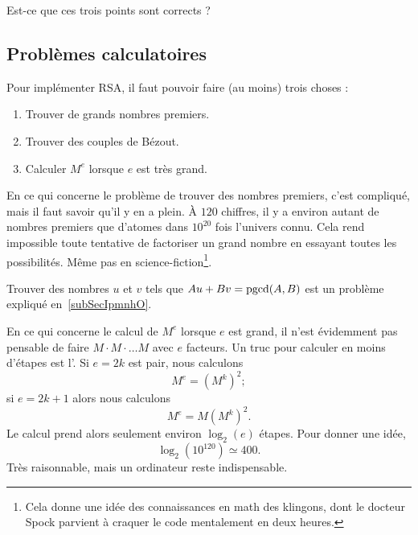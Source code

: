 \begin{probleme}\label{ProbGAYFooZATuYy}
    Est-ce que ces trois points sont corrects ?
\end{probleme}

\subsection{Problèmes calculatoires}

Pour implémenter RSA, il faut pouvoir faire (au moins) trois choses :
\begin{enumerate}
    \item
        Trouver de grands nombres premiers.
    \item
        Trouver des couples de Bézout.
    \item
        Calculer \( M^e\) lorsque \( e\) est très grand.
\end{enumerate}
En ce qui concerne le problème de trouver des nombres premiers, c'est compliqué, mais il faut savoir qu'il y en a plein. À \( 120\) chiffres, il y a environ autant de nombres premiers que d'atomes dans \( 10^{20}\) fois l'univers connu. Cela rend impossible toute tentative de factoriser un grand nombre en essayant toutes les possibilités. Même pas en science-fiction\footnote{Cela donne une idée des connaissances en math des klingons, dont le docteur Spock parvient à craquer le code mentalement en deux heures.}.

Trouver des nombres \( u\) et \( v\) tels que \( Au+Bv=\operatorname{pgcd}(A,B)\) est un problème expliqué en~\ref{subSecIpmnhO}.

En ce qui concerne le calcul de \( M^e\) lorsque \( e\) est grand, il n'est évidemment pas pensable de faire \( M\cdot M\cdot\ldots M\) avec \( e\) facteurs. Un truc pour calculer en moins d'étapes est l'. Si \( e=2k\) est pair, nous calculons
\begin{equation}
    M^e=(M^k)^2;
\end{equation}
si \( e=2k+1\) alors nous calculons
\begin{equation}
    M^e=M(M^k)^2.
\end{equation}
Le calcul prend alors seulement environ \(  \log_2(e)  \) étapes. Pour donner une idée,
\begin{equation}
    \log_2(10^{120})\simeq 400.
\end{equation}
Très raisonnable, mais un ordinateur reste indispensable.

